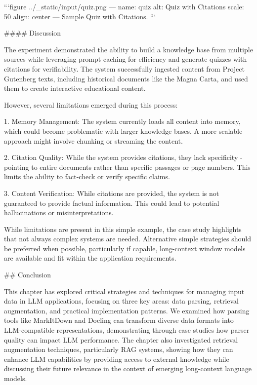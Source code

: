 {{```{figure} ../_static/input/quiz.png
---
name: quiz
alt: Quiz with Citations
scale: 50%
align: center
---
Sample Quiz with Citations.
```


#### Discussion

The experiment demonstrated the ability to build a knowledge base from multiple sources while leveraging prompt caching for efficiency and generate quizzes with citations for verifiability. The system successfully ingested content from Project Gutenberg texts, including historical documents like the Magna Carta, and used them to create interactive educational content.

However, several limitations emerged during this process:

1. Memory Management: The system currently loads all content into memory, which could become problematic with larger knowledge bases. A more scalable approach might involve chunking or streaming the content.

2. Citation Quality: While the system provides citations, they lack specificity - pointing to entire documents rather than specific passages or page numbers. This limits the ability to fact-check or verify specific claims.

3. Content Verification: While citations are provided, the system is not guaranteed to provide factual information. This could lead to potential hallucinations or misinterpretations.

While limitations are present in this simple example, the case study highlights that not always complex systems are needed. Alternative simple strategies should be preferred when possible, particularly if capable, long-context window models are available and fit within the application requirements.


## Conclusion

This chapter has explored critical strategies and techniques for managing input data in LLM applications, focusing on three key areas: data parsing, retrieval augmentation, and practical implementation patterns. We examined how parsing tools like MarkItDown and Docling can transform diverse data formats into LLM-compatible representations, demonstrating through case studies how parser quality can impact LLM performance. The chapter also investigated retrieval augmentation techniques, particularly RAG systems, showing how they can enhance LLM capabilities by providing access to external knowledge while discussing their future relevance in the context of emerging long-context language models.

}}
